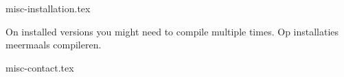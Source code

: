 \documentclass[presentatie.tex]{subfiles}
\begin{document}
\lang
{
    \section{\texorpdfstring{}{Good to know}}
}
{
    \section{\texorpdfstring{}{Goed om te weten}}
}

\clearrecentlist

{misc-installation.tex}

\begin{frame}
    \lang
    {On installed versions you might need to compile multiple times.}
    {Op installaties meermaals compileren.}
\end{frame}

{misc-contact.tex}
\end{document}
